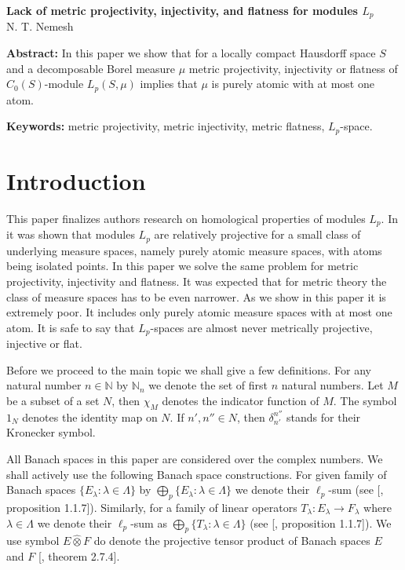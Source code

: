 \documentclass[12pt]{article}
\newcommand{\projtens}{\mathbin{\widehat{\otimes}}}
\begin{document}
\begin{center}
    \Large \textbf{Lack of metric projectivity, injectivity, 
    and flatness for modules $L_p$}\\[0.5cm]
    \small {N. T. Nemesh}\\[0.5cm]
\end{center}

\thispagestyle{empty}

\medskip
\textbf{Abstract:} In this paper we show that for a locally compact Hausdorff 
space $S$ and a decomposable Borel measure $\mu$ metric projectivity, 
injectivity or flatness of $C_0(S)$-module $L_p(S,\mu)$ implies 
that $\mu$ is purely atomic with at most one atom.
\medskip

\textbf{Keywords:} metric projectivity, metric injectivity, metric flatness, 
$L_p$-space.

\bigskip


\section{Introduction}\label{SctnIntro}

This paper finalizes authors research on homological properties of modules $L_p$.
In \cite{NemRelProjModLp} it was shown that modules $L_p$ are relatively 
projective for a small class of underlying measure spaces, namely purely atomic 
measure spaces, with atoms being isolated points. In this paper we solve the same
problem for metric projectivity, injectivity and flatness. It was expected that
for metric theory the class of measure spaces has to be even narrower. 
As we show in this paper it is extremely poor. It includes only purely atomic 
measure spaces with at most one atom. It is safe to say that $L_p$-spaces 
are almost never metrically projective, injective or flat. 

Before we proceed to the main topic we shall give a few definitions. For any 
natural number $n\in\mathbb{N}$ by $\mathbb{N}_n$ we denote the set of 
first $n$ natural numbers. Let $M$ be a subset of a set $N$, then $\chi_M$ 
denotes the indicator function of $M$. The symbol $1_N$ denotes the identity 
map on $N$. If $n',n''\in N$, then $\delta_{n'}^{n''}$ stands for their 
Kronecker symbol.

All Banach spaces in this paper are considered over the complex numbers. 
We shall actively use the following Banach space constructions.
For given family of Banach spaces $\{E_\lambda: \lambda\in\Lambda\}$ 
by $\bigoplus_p\{E_\lambda: \lambda\in\Lambda\}$ we denote their $\ell_p$-sum 
(see [\cite{HelLectAndExOnFuncAn}, proposition 1.1.7]).
Similarly, for a family of linear operators $T_\lambda:E_\lambda\to F_\lambda$
where $\lambda\in\Lambda$ we denote their $\ell_p$-sum as
$\bigoplus_p\{T_\lambda:\lambda\in\Lambda\}$ 
(see [\cite{HelLectAndExOnFuncAn}, proposition 1.1.7]). We use 
symbol $E\projtens F$ do denote the projective tensor product of Banach 
spaces $E$ and $F$ [\cite{HelLectAndExOnFuncAn}, theorem 2.7.4].
\end{document}
